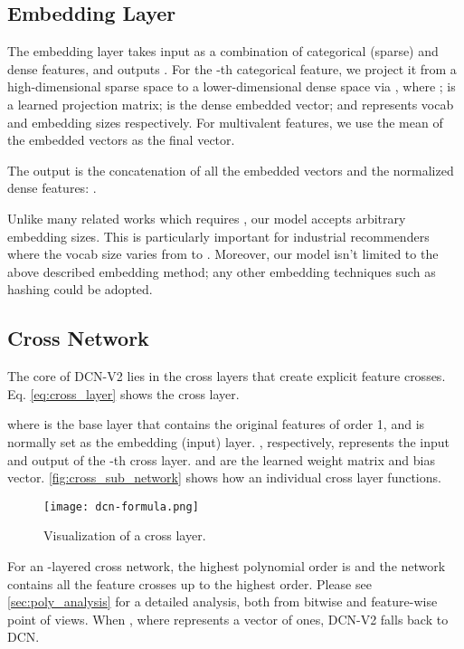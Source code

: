 \documentclass[sigconf]{acmart}
\begin{document}
\subsection{Embedding Layer}

The embedding layer takes input as a combination of categorical (sparse) and dense features, and outputs . For the -th categorical feature, we project it from a high-dimensional sparse space to a lower-dimensional dense space via
,
where ;  is a learned projection matrix;  is the dense embedded vector;  and  represents vocab and embedding sizes respectively. For multivalent features, we use the mean of the embedded vectors as the final vector. 

The output is the concatenation of all the embedded vectors and the normalized dense features:
.


Unlike many related works \cite{song2019autoint, lian2018xdeepfm, qu2016product, guo2017deepfm, naumov2019deep, he2017neural} which requires , our model accepts arbitrary embedding sizes. This is particularly important for industrial recommenders where the vocab size varies from  to . Moreover, our model isn't limited to the above described embedding method; any other embedding techniques such as hashing could be adopted. 

\subsection{Cross Network}
The core of {DCN-V2} lies in the cross layers that create explicit feature crosses. Eq. \eqref{eq:cross_layer} shows the  cross layer.


where  is the base layer that contains the original features of order 1, and is normally set as the embedding (input) layer. , respectively, represents the input and output of the  -th cross layer.  and  are the learned weight matrix and bias vector. \autoref{fig:cross_sub_network} shows how an individual cross layer functions.

\begin{figure}[htbp]
  \centering
  \texttt{[image: dcn-formula.png]}
\vspace{-2ex}
\caption{Visualization of a cross layer.}
  \label{fig:cross_sub_network}
\vspace{-1ex}
\end{figure}

For an -layered cross network, the highest polynomial order is  and the network contains all the feature crosses up to the highest order. Please see \autoref{sec:poly_analysis} for a detailed analysis, both from bitwise and feature-wise point of views. When , where  represents a vector of ones, {DCN-V2} falls back to {DCN}.
\end{document}
